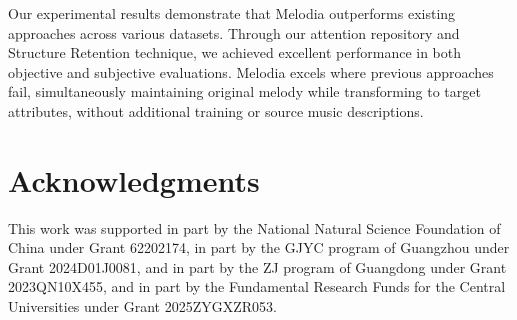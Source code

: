 Our experimental results demonstrate that Melodia outperforms existing approaches across various datasets. Through our attention repository and Structure Retention technique, we achieved excellent performance in both objective and subjective evaluations. Melodia excels where previous approaches fail, simultaneously maintaining original melody while transforming to target attributes, without additional training or source music descriptions.

\section{Acknowledgments}
This work was supported in part by the National Natural Science Foundation of China under Grant 62202174, in part by the GJYC program of Guangzhou under Grant 2024D01J0081, and in part by the ZJ program of Guangdong under Grant 2023QN10X455, and in part by the Fundamental Research Funds for the Central Universities under Grant 2025ZYGXZR053.
